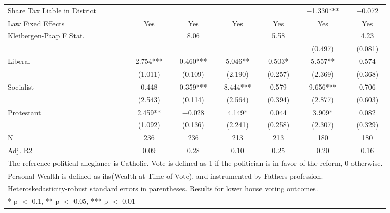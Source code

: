 \begin{table}[!h]
{\begin{tabular}[t]{lcccccc}
Share Tax Liable in District &  &  &  &  & \num{-1.330}*** & \num{-0.072}\\
Law Fixed Effects & Yes & Yes & Yes & Yes & Yes & Yes\\
Kleibergen-Paap F Stat. &  & 8.06 &  & 5.58 &  & 4.23\\
 &  &  &  &  & (\num{0.497}) & (\num{0.081})\\
Liberal & \num{2.754}*** & \num{0.460}*** & \num{5.046}** & \num{0.503}* & \num{5.557}** & \num{0.574}\\
 & (\num{1.011}) & (\num{0.109}) & (\num{2.190}) & (\num{0.257}) & (\num{2.369}) & (\num{0.368})\\
Socialist & \num{0.448} & \num{0.359}*** & \num{8.444}*** & \num{0.579} & \num{9.656}*** & \num{0.706}\\
 & (\num{2.543}) & (\num{0.114}) & (\num{2.564}) & (\num{0.394}) & (\num{2.877}) & (\num{0.603})\\
Protestant & \num{2.459}** & \num{-0.028} & \num{4.149}* & \num{0.044} & \num{3.909}* & \num{0.082}\\
 & (\num{1.092}) & (\num{0.136}) & (\num{2.241}) & (\num{0.258}) & (\num{2.307}) & (\num{0.329})\\
N & \num{236} & \num{236} & \num{213} & \num{213} & \num{180} & \num{180}\\
\midrule
Adj. R2 & \num{0.09} & \num{0.28} & \num{0.10} & \num{0.25} & \num{0.20} & \num{0.16}\\
\bottomrule
\multicolumn{7}{l}{\rule{0pt}{1em}The reference political allegiance is Catholic. Vote is defined as 1 if the politician is in favor of the reform, 0 otherwise.}\\
\multicolumn{7}{l}{\rule{0pt}{1em}Personal Wealth is defined as ihs(Wealth at Time of Vote), and instrumented by Fathers profession.}\\
\multicolumn{7}{l}{\rule{0pt}{1em}Heteroskedasticity-robust standard errors in parentheses. Results for lower house voting outcomes.}\\
\multicolumn{7}{l}{\rule{0pt}{1em}* p $<$ 0.1, ** p $<$ 0.05, *** p $<$ 0.01}\\
\end{tabular}}
\end{table}
